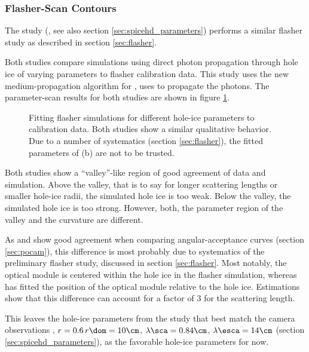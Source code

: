 \subsubsection{ Flasher-Scan Contours}
\label{sec:spicehd_flasher_scan_contours}

The  study (, see also section \ref{sec:spicehd_parameters}) performs a similar flasher study as described in section \ref{sec:flasher}.

Both studies compare simulations using direct photon propagation through hole ice of varying parameters to flasher calibration data. This study uses the new medium-propagation algorithm for \clsim,  uses \ppc to propagate the photons. The parameter-scan results for both studies are shown in figure \ref{fig:ahCoHee4}.

\begin{figure}[htbp]
  \hfill
  \caption{Fitting flasher simulations for different hole-ice parameters to calibration data. Both studies show a similar qualitative behavior. Due to a number of systematics (section \ref{sec:flasher}), the fitted parameters of (b) are not to be trusted.}
  \label{fig:ahCoHee4}
\end{figure}

Both studies show a ``valley''-like region of good agreement of data and simulation. Above the valley, that is to say for longer scattering lengths or smaller hole-ice radii, the simulated hole ice is too weak. Below the valley, the simulated hole ice is too strong. However, both, the parameter region of the valley and the curvature are different.

As \clsim and \ppc show good agreement when comparing angular-acceptance curves (section \ref{sec:pocam}), this difference is most probably due to systematics of the preliminary flasher study, discussed in section \ref{sec:flasher}. Most notably, the optical module is centered within the hole ice in the \clsim flasher simulation, whereas  has fitted the position of the optical module relative to the hole ice. Estimations show that this difference can account for a factor of $3$ for the scattering length.


This leaves the hole-ice parameters from the  study \cite{martinspicehddard} that best match the camera observations \cite{rongenswedishcamera}, $r = 0.6\,r\dom = 10\cm$, $\lambda\sca = 0.84\cm$, $\lambda\esca = 14\cm$ (section \ref{sec:spicehd_parameters}), as the favorable hole-ice parameters for now.
